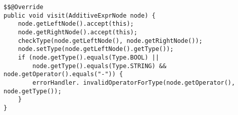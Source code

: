 \begin{lstlisting}[caption={Visit additive expression node}, label={code:TC:Additive}]
$$@Override
public void visit(AdditiveExprNode node) {
    node.getLeftNode().accept(this);
    node.getRightNode().accept(this);
    checkType(node.getLeftNode(), node.getRightNode());
    node.setType(node.getLeftNode().getType());
    if (node.getType().equals(Type.BOOL) ||
        node.getType().equals(Type.STRING) && node.getOperator().equals("-")) {
        errorHandler. invalidOperatorForType(node.getOperator(), node.getType());
    }
}
\end{lstlisting}